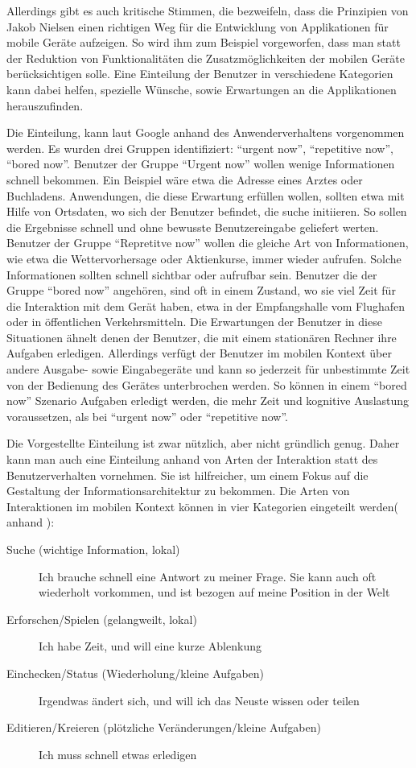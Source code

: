 Allerdings gibt es auch kritische Stimmen, die bezweifeln, dass die Prinzipien von Jakob Nielsen einen richtigen Weg für die Entwicklung von Applikationen für mobile Geräte aufzeigen\cite{nielsenKritik}. So wird ihm zum Beispiel vorgeworfen, dass man statt der Reduktion von Funktionalitäten die Zusatzmöglichkeiten der mobilen Geräte berücksichtigen solle. Eine Einteilung der Benutzer in verschiedene Kategorien kann dabei helfen, spezielle Wünsche, sowie Erwartungen an die Applikationen herauszufinden.

Die Einteilung, kann laut Google anhand des Anwenderverhaltens vorgenommen werden. Es wurden drei Gruppen identifiziert: “urgent now”, “repetitive now”, “bored now”\cite{googleUsers}. Benutzer der Gruppe “Urgent now” wollen wenige Informationen schnell bekommen. Ein Beispiel wäre etwa die Adresse eines  Arztes oder Buchladens. Anwendungen, die diese Erwartung erfüllen wollen, sollten etwa mit Hilfe von Ortsdaten, wo sich der Benutzer befindet, die suche initiieren. So sollen die Ergebnisse schnell und ohne bewusste Benutzereingabe geliefert werten. Benutzer der Gruppe “Repretitve now” wollen die gleiche Art von Informationen, wie etwa die Wettervorhersage oder Aktienkurse, immer wieder aufrufen. Solche Informationen sollten schnell sichtbar oder aufrufbar sein. Benutzer die der Gruppe “bored now” angehören, sind oft in einem Zustand, wo sie viel Zeit für die Interaktion mit dem Gerät haben, etwa in der Empfangshalle vom Flughafen oder in öffentlichen Verkehrsmitteln. Die Erwartungen der Benutzer in diese Situationen ähnelt denen der Benutzer, die mit einem stationären Rechner ihre Aufgaben erledigen. Allerdings verfügt der Benutzer im mobilen Kontext über andere Ausgabe- sowie Eingabegeräte und kann so jederzeit für unbestimmte Zeit von der Bedienung des Gerätes unterbrochen werden. So können in einem “bored now” Szenario Aufgaben erledigt werden, die mehr Zeit und kognitive Auslastung voraussetzen, als bei “urgent now” oder “repetitive now”.

Die Vorgestellte Einteilung ist zwar nützlich, aber nicht gründlich genug. Daher kann man auch eine Einteilung anhand von Arten der Interaktion statt des Benutzerverhalten vornehmen. Sie ist hilfreicher, um einem Fokus auf die Gestaltung der Informationsarchitektur zu bekommen. Die  Arten von Interaktionen im mobilen Kontext können in vier Kategorien eingeteilt werden( anhand \cite[Seite 50]{mobileFirst}):

\begin{description}
 	\item[Suche (wichtige Information, lokal)] Ich brauche schnell eine Antwort zu meiner Frage. Sie kann auch oft wiederholt vorkommen, und ist bezogen auf meine Position in der Welt
 	\item[Erforschen/Spielen (gelangweilt, lokal)] Ich habe Zeit, und will eine kurze Ablenkung
 	\item[Einchecken/Status (Wiederholung/kleine Aufgaben)] Irgendwas ändert sich, und will ich das Neuste wissen oder teilen
 	\item[Editieren/Kreieren (plötzliche Veränderungen/kleine Aufgaben)] Ich muss schnell etwas erledigen
 \end{description} 

